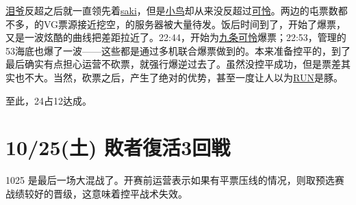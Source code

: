 \uline{泪爷}反超之后就一直领先着\uline{saki}，但是\uline{小鸟}却从来没反超过\uline{可怜}。两边的屯票数都不多，的VG票源接近挖空，的服务器被大量待发。饭后时间到了，开始了爆票，又是一波炫酷的曲线把差距拉近了。22:44，开始为\uline{九条可怜}爆票；22:53，管理的53海底也爆了一波——这些都是通过多机联合爆票做到的。本来准备控平的，到了最后确实有点担心运营不砍票，就强行爆逆过去了。虽然没控平成功，但是票差其实也不大。当然，砍票之后，产生了绝对的优势，甚至一度让人以为\uline{RUN}是豚。

至此，24占12达成。
\newpage
\section{10/25(土) 敗者復活3回戦}

1025 是最后一场大混战了。开赛前运营表示如果有平票压线的情况，则取预选赛战绩较好的晋级，这意味着控平战术失效。

